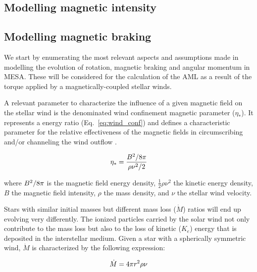 \documentclass[fleqn,usenatbib]{mnras}
\begin{document}
\subsection{Modelling magnetic intensity} \label{mod_mbi}


\subsection{Modelling magnetic braking} \label{mod_mb}
We start by enumerating the most relevant aspects and assumptions made in modelling the evolution of rotation, magnetic braking and angular momentum in MESA. These will be considered for the calculation of the AML as a result of the torque applied by a magnetically-coupled stellar winds.\par 

A relevant parameter to characterize the influence of a given magnetic field on the stellar wind is the denominated wind confinement magnetic parameter ($\eta_*$). It represents a energy ratio (Eq.~\ref{eq:wind_conf}) and defines a characteristic parameter for the relative effectiveness of the magnetic fields in circumscribing and/or channeling the wind outflow \citep{UdDoula2002}.\par

\begin{ceqn}
\begin{equation}
    \eta_* = \frac{B^{2}/8\pi}{\rho\nu^2/2} \label{eq:wind_conf}
\end{equation}
\end{ceqn}

where $B^{2}/8\pi$ is the magnetic field energy density, $\frac{1}{2}\rho\nu^{2}$ the kinetic energy density, $B$ the magnetic field intensity, $\rho$ the mass density, and $\nu$ the stellar wind velocity.\par

Stars with similar initial masses but different mass loss ($\Dot{M}$) ratios will end up evolving very differently. The ionized particles carried by the solar wind not only contribute to the mass loss but also to the loss of kinetic ($K_e$) energy that is deposited in the interstellar medium. Given a star with a spherically symmetric wind, $\Dot{M}$ is characterized by the following expression:

\begin{ceqn}
\begin{equation}
    \Dot{M} = 4\pi r^2\rho\nu \label{eq:mass_loss}
\end{equation}
\end{ceqn}
\end{document}
